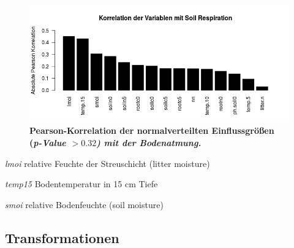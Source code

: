 \begin{figure}
	\centering
	\includegraphics[width=\textwidth]{fig/model/correlation-pearson-normal.png}
	\caption{\bf{Pearson-Korrelation} der normalverteilten Einflussgrößen (\it{p-Value} $> 0.32$) mit der Bodenatmung.}
    \label{fig:pearson}
\end{figure}

\begin{compactitem}
\item
  \emph{lmoi} relative Feuchte der Streuschicht (litter moisture)
\item
  \emph{temp15} Bodentemperatur in 15 cm Tiefe
\item
  \emph{smoi} relative Bodenfeuchte (soil moisture)
\end{compactitem}

\subsection{Transformationen}

